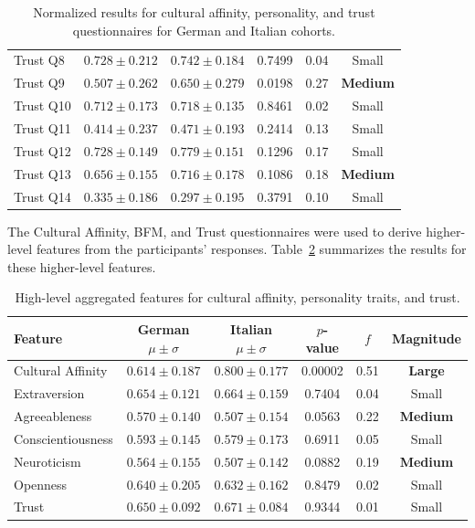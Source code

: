 \begin{table}[!ht]
\begin{tabular}{lccccc}
Trust Q8 & $0.728 \pm 0.212$ & $0.742 \pm 0.184$ & 0.7499 & 0.04 & Small \\
Trust Q9 & $0.507 \pm 0.262$ & $0.650 \pm 0.279$ & 0.0198 & 0.27 & \textbf{Medium} \\
Trust Q10 & $0.712 \pm 0.173$ & $0.718 \pm 0.135$ & 0.8461 & 0.02 & Small \\
Trust Q11 & $0.414 \pm 0.237$ & $0.471 \pm 0.193$ & 0.2414 & 0.13 & Small \\
Trust Q12 & $0.728 \pm 0.149$ & $0.779 \pm 0.151$ & 0.1296 & 0.17 & Small \\
Trust Q13 & $0.656 \pm 0.155$ & $0.716 \pm 0.178$ & 0.1086 & 0.18 & \textbf{Medium} \\
Trust Q14 & $0.335 \pm 0.186$ & $0.297 \pm 0.195$ & 0.3791 & 0.10 & Small \\
\bottomrule
\end{tabular}
\caption{Normalized results for cultural affinity, personality, and trust questionnaires for German and Italian cohorts.}
\label{ch9:tab:intro}
\end{table}

The Cultural Affinity, BFM, and Trust questionnaires were used to derive higher-level features from the participants' responses. Table~\ref{ch9:tab:intro_high_level} summarizes the results for these higher-level features.

\begin{table}[!ht]
\centering
\begin{tabular}{lccccc}
\toprule
Feature & German $\mu \pm \sigma$ & Italian $\mu \pm \sigma$  & $p$-value & $f$ & Magnitude \\
\midrule
Cultural Affinity & $0.614 \pm 0.187$ & $0.800 \pm 0.177$ & 0.00002 & 0.51 & \textbf{Large} \\
Extraversion & $0.654 \pm 0.121$ & $0.664 \pm 0.159$ & 0.7404 & 0.04 & Small \\
Agreeableness & $0.570 \pm 0.140$ & $0.507 \pm 0.154$ & 0.0563 & 0.22 & \textbf{Medium} \\
Conscientiousness & $0.593 \pm 0.145$ & $0.579 \pm 0.173$ & 0.6911 & 0.05 & Small \\
Neuroticism & $0.564 \pm 0.155$ & $0.507 \pm 0.142$ & 0.0882 & 0.19 & \textbf{Medium} \\
Openness & $0.640 \pm 0.205$ & $0.632 \pm 0.162$ & 0.8479 & 0.02 & Small \\
Trust & $0.650 \pm 0.092$ & $0.671 \pm 0.084$ & 0.9344 & 0.01 & Small \\
\bottomrule
\end{tabular}
\caption{High-level aggregated features for cultural affinity, personality traits, and trust.}
\label{ch9:tab:intro_high_level}
\end{table}

